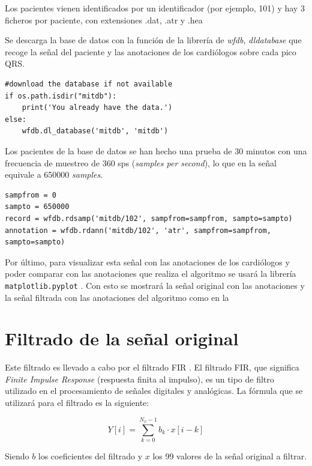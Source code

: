 Los pacientes vienen identificados por un identificador (por ejemplo, 101) y hay 3 ficheros por paciente, 
con extensiones .dat, .atr y .hea

Se descarga la base de datos \cite{mitdb} con la función de la librería de \textit{wfdb}, \textit{dldatabase} que recoge 
la señal del paciente y las anotaciones de los cardiólogos sobre cada pico QRS.


\lstset{language=python, breaklines=true, basicstyle=\footnotesize}
\begin{lstlisting}[frame=single]
#download the database if not available
if os.path.isdir("mitdb"):
	print('You already have the data.')
else:
	wfdb.dl_database('mitdb', 'mitdb')
\end{lstlisting}

Los pacientes de la base de datos se han hecho una prueba de 30 minutos con una frecuencia de muestreo de 360 sps (\textit{samples per second}), lo que en la señal 
equivale a 650000 \textit{samples}.

\lstset{language=python, breaklines=true, basicstyle=\footnotesize}
\begin{lstlisting}[frame=single]
sampfrom = 0
sampto = 650000
record = wfdb.rdsamp('mitdb/102', sampfrom=sampfrom, sampto=sampto)
annotation = wfdb.rdann('mitdb/102', 'atr', sampfrom=sampfrom, sampto=sampto)
\end{lstlisting}

Por último, para visualizar esta señal con las anotaciones de los cardiólogos y poder comparar con las anotaciones que realiza el algoritmo se usará la librería \texttt{matplotlib.pyplot} \cite{Matplotlib}. Con esto se mostrará la señal original con las anotaciones y la señal filtrada con las anotaciones del algoritmo como en la 

\section{Filtrado de la señal original}
Este filtrado es llevado a cabo por el filtrado FIR \cite{FIR}. El filtrado FIR, que significa \textit{Finite Impulse Response} (respuesta finita al impulso), es un tipo de filtro utilizado en el procesamiento de señales digitales y analógicas. La fórmula que se utilizará para el filtrado es la siguiente:

\[ Y[i] = \sum_{k=0}^{N_x -1} b_k \cdot x[i-k] \]

Siendo $b$ los coeficientes del filtrado y $x$ los 99 valores de la señal original a filtrar.

